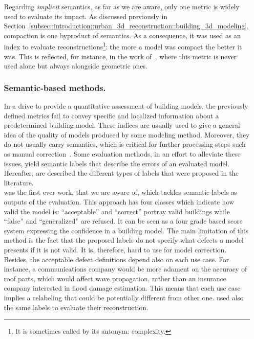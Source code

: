             Regarding \textit{implicit} semantics, as far as we are aware, only one metric is widely used to evaluate its impact.
            As discussed previously in Section~\ref{subsec::introduction::urban_3d_reconstruction::building_3d_modeling}, compaction is one byproduct of semantics.
            As a consequence, it was used as an index to evaluate reconstructions\footnote{It is sometimes called by its antonym: complexity.}: the more a model was compact the better it was.
            This is reflected, for instance, in the work of~\textcite{lafarge2012creating,duan_eccv16,zhang2017deep,zeng2018neural,zhu2018large}, where this metric is never used alone but always alongside geometric ones.

        \subsubsection{Semantic-based methods.}
            \label{subsec::state_of_the_art::quality::output::semantic}
            In a drive to provide a quantitative assessment of building models, the previously defined metrics fail to convey specific and localized information about a predetermined building model.
            These indices are usually used to give a general idea of the quality of models produced by some modeling method.
            Moreover, they do not usually carry semantics, which is critical for further processing steps such as manual correction~\parencite{elberink2011quality}.
            Some evaluation methods, in an effort to alleviate these issues, yield semantic labels that describe the errors of an evaluated model.
            Hereafter, are described the different types of labels that were proposed in the literature.\\

            \parencite{boudet2006supervised} was the first ever work, that we are aware of, which tackles semantic labels as outputs of the evaluation.
            This approach has four classes which indicate how valid the model is: ``acceptable'' and ``correct'' portray valid buildings while ``false'' and ``generalized'' are refused.
            It can be seen as a four grade based score system expressing the confidence in a building model.
            The main limitation of this method is the fact that the proposed labels do not specify what defects a model presents if it is not valid.
            It is, therefore, hard to use for model correction.
            Besides, the acceptable defect definitions depend also on each use case.
            For instance, a communications company would be more adament on the accuracy of roof parts, which would affect wave propagation, rather than an insurance company interested in flood damage estimation.
            This means that each use case implies a relabeling that could be potentially different from other one.
            \textcite{durupt2006automatic} used also the same labels to evaluate their reconstruction.\\
            
